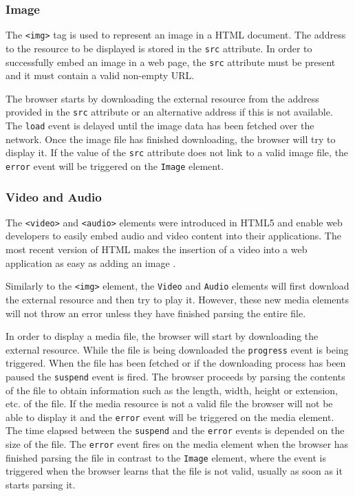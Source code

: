 \documentclass[10pt,a4paper,twoside]{book}
\begin{document}
\subsubsection{Image}
The \texttt{<img>} tag is used to represent an image in a HTML document. The address to the resource to be displayed is stored in the \texttt{src} attribute. In order to successfully embed an image in a web page, the \texttt{src} attribute must be present and it must contain a valid non-empty URL\cite{berjon2014html}.

The browser starts by downloading the external resource from the address provided in the \texttt{src} attribute or an alternative address if this is not available. The \texttt{load} event is delayed until the image data has been fetched over the network. Once the image file has finished downloading, the browser will try to display it. If the value of the \texttt{src} attribute does not link to a valid image file, the \texttt{error} event will be triggered on the \texttt{Image} element\cite{berjon2014html}.

\subsubsection{Video and Audio}
The \texttt{<video>} and \texttt{<audio>} elements were introduced in HTML5 and enable web developers to easily embed audio and video content into their applications. The most recent version of HTML makes the insertion of a video into a web application as easy as adding an image \cite{berjon2014html}.

Similarly to the \texttt{<img>} element, the \texttt{Video} and  \texttt{Audio} elements will first download the external resource and then try to play it. However, these new media elements will not throw an error unless they have finished parsing the entire file\cite{berjon2014html}.

In order to display a media file, the browser will start by downloading the external resource. While the file is being downloaded the \texttt{progress} event is being triggered. When the file has been fetched or if the downloading process has been paused the \texttt{suspend} event is fired. The browser proceeds by parsing the contents of the file to obtain information such as the length, width, height or extension, etc. of the file. If the media resource is not a valid file the browser will not be able to display it and the \texttt{error} event will be triggered on the media element. The time elapsed between the \texttt{suspend} and the \texttt{error} events is depended on the size of the file. The \texttt{error} event fires on the media element when the browser has finished parsing the file in contrast to the \texttt{Image} element, where the event is triggered when the browser learns that the file is not valid, usually as soon as it starts parsing it\cite{berjon2014html}.
\end{document}
